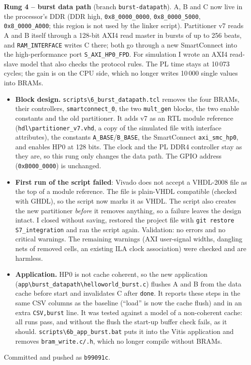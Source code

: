 \documentclass[11pt,a4paper]{article}
\newcommand{\code}[1]{\texttt{#1}}
\begin{document}
\textbf{Rung 4 -- burst data path} (branch \code{burst-datapath}). A, B and C now live in the processor's DDR (DDR high, \code{0x8\_0000\_0000}, \code{0x8\_0000\_5000}, \code{0x8\_0000\_A000}; this region is not used by the linker script). Partitioner v7 reads A and B itself through a 128-bit AXI4 read master in bursts of up to 256 beats, and \code{RAM\_INTERFACE} writes C there; both go through a new SmartConnect into the high-performance port \code{S\_AXI\_HP0\_FPD}. For simulation I wrote an AXI4 read-slave model that also checks the protocol rules. The PL time stays at 10\,073 cycles; the gain is on the CPU side, which no longer writes 10\,000 single values into BRAMs.
\begin{itemize}[noitemsep]
  \item \textbf{Block design.} \code{scripts\textbackslash 6\_burst\_datapath.tcl} removes the four BRAMs, their controllers, \code{smartconnect\_0}, the two \code{mult\_gen} blocks, the two enable constants and the old partitioner. It adds v7 as an RTL module reference (\code{hdl\textbackslash partitioner\_v7.vhd}, a copy of the simulated file with interface attributes), the constants \code{A\_BASE}/\code{B\_BASE}, the SmartConnect \code{axi\_smc\_hp0}, and enables HP0 at 128 bits. The clock and the PL DDR4 controller stay as they are, so this rung only changes the data path. The GPIO address (\code{0xB000\_0000}) is unchanged.
  \item \textbf{First run of the script failed}: Vivado does not accept a VHDL-2008 file as the top of a module reference. The file is plain-VHDL compatible (checked with GHDL), so the script now marks it as VHDL. The script also creates the new partitioner \emph{before} it removes anything, so a failure leaves the design intact. I closed without saving, restored the project file with \code{git restore S7\_integration} and ran the script again. Validation: no errors and no critical warnings. The remaining warnings (AXI user-signal widths, dangling nets of removed cells, an existing ILA clock association) were checked and are harmless.
  \item \textbf{Application.} HP0 is not cache coherent, so the new application (\code{app\textbackslash burst\_datapath\textbackslash}\allowbreak\code{helloworld\_burst.c}) flushes A and B from the data cache before start and invalidates C after \code{done}. It reports these steps in the same CSV columns as the baseline (``load'' is now the cache flush) and in an extra \code{CSV,burst} line. It was tested against a model of a non-coherent cache: all runs pass, and without the flush the start-up buffer check fails, as it should. \code{scripts\textbackslash 6b\_app\_burst.bat} puts it into the Vitis application and removes \code{bram\_write.c/.h}, which no longer compile without BRAMs.
\end{itemize}
Committed and pushed as \code{b99091c}.
\end{document}
